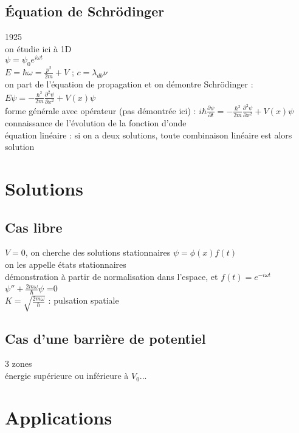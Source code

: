 \subsection{Équation de Schrödinger}
1925 \\
on étudie ici à 1D \\
$\psi=\psi_0 e^{i\omega t}$ \\
$E=\hbar \omega=\frac{p^2}{2m}+V$ ; $c=\lambda_{db} \nu$ \\
on part de l'équation de propagation et on démontre Schrödinger : $E \psi=-\frac{\hbar^2}{2m} \frac{\partial^2  \psi}{\partial x^2} +V(x) \psi$ \\
forme générale avec opérateur (pas démontrée ici) : $i\hbar \frac{\partial \psi}{\partial t}=-\frac{\hbar^2 }{2 m} \frac{\partial^2  \psi}{\partial x^2} + V(x) \psi $ \\
connaissance de l'évolution de la fonction d'onde\\
équation linéaire : si on a deux solutions, toute combinaison linéaire est alors solution \\

\section{Solutions}
\subsection{Cas libre}
$V=0$, on cherche des solutions stationnaires $\psi=\phi(x) f(t)$ \\
on les appelle états stationnaires \\
démonstration à partir de normalisation dans l'espace, et $f(t)=e^{-i\omega t}$ \\
$\psi ''+\frac{2m\omega}{\hbar} \psi$ =0 \\
$K=\sqrt{\frac{2m\omega}{\hbar}}$ : pulsation spatiale \\

\subsection{Cas d'une barrière de potentiel}
3 zones \\
énergie supérieure ou inférieure à $V_0$... \\

\section{Applications}

